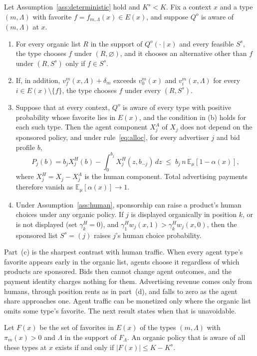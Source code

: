 \documentclass[opre,dblanonrev]{informs4}
\providecommand{\E}{\mathbb{E}}
\providecommand{\1}{\mathbf{1}}
\begin{document}
\begin{proposition}\label{prop:rents}
Let Assumption~\ref{ass:deterministic} hold and $K^s<K$. Fix a context $x$ and a type $(m,\Lambda)$ with favorite $f=f_{m,\Lambda}(x)\in E(x)$, and suppose $Q^o$ is aware of $(m,\Lambda)$ at $x$.
\begin{enumerate}
\item[(a)] For every organic list $R$ in the support of $Q^o(\cdot\mid x)$ and every feasible $S^s$, the type chooses $f$ under $(R,\varnothing)$, and it chooses an alternative other than $f$ under $(R,S^s)$ only if $f\in S^s$.
\item[(b)] If, in addition, $v_f^m(x,\Lambda)+\delta_m$ exceeds $v_0^m(x)$ and $v_i^m(x,\Lambda)$ for every $i\in E(x)\setminus\{f\}$, the type chooses $f$ under every $(R,S^s)$.
\item[(c)] Suppose that at every context, $Q^o$ is aware of every type with positive probability whose favorite lies in $E(x)$, and the condition in (b) holds for each such type. Then the agent component $X_j^A$ of $X_j$ does not depend on the sponsored policy, and under rule~\eqref{eq:alloc}, for every advertiser $j$ and bid profile $b$,
\[
P_j(b)=b_jX_j^H(b)-\int_0^{b_j}X_j^H(z,b_{-j})\,dz\;\le\;b_j\,n\,\E_\mu[1-\alpha(x)],
\]
where $X_j^H=X_j-X_j^A$ is the human component. Total advertising payments therefore vanish as $\E_\mu[\alpha(x)]\to1$.
\item[(d)] Under Assumption~\ref{ass:human}, sponsorship can raise a product's human choices under any organic policy. If $j$ is displayed organically in position $k$, or is not displayed (set $\gamma^H_k=0$), and $\gamma^H_1w_j(x,1)>\gamma^H_kw_j(x,0)$, then the sponsored list $S^s=(j)$ raises $j$'s human choice probability.
\end{enumerate}
\end{proposition}

Part~(c) is the sharpest contrast with human traffic. When every agent type's favorite appears early in the organic list, agents choose it regardless of which products are sponsored. Bids then cannot change agent outcomes, and the payment identity charges nothing for them. Advertising revenue comes only from humans, through position rents as in part~(d), and falls to zero as the agent share approaches one. Agent traffic can be monetized only where the organic list omits some type's favorite. The next result states when that is unavoidable.

\begin{corollary}\label{cor:aware}
Let $F(x)$ be the set of favorites in $E(x)$ of the types $(m,\Lambda)$ with $\pi_m(x)>0$ and $\Lambda$ in the support of $F_\Lambda$. An organic policy that is aware of all these types at $x$ exists if and only if $|F(x)|\le K-K^s$.
\end{corollary}
\end{document}
